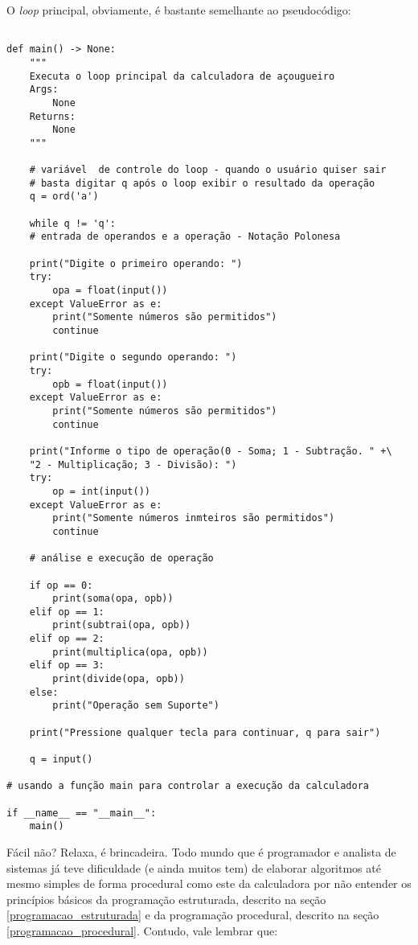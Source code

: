 \documentclass[a4paper, 12pt, onecolumn,singlespacing]{article}
\begin{document}
O \textit{loop} principal, obviamente, é bastante semelhante ao pseudocódigo:
\begin{verbatim}

def main() -> None:
	"""
	Executa o loop principal da calculadora de açougueiro
	Args:
		None
	Returns:
		None
	"""
	
	# variável  de controle do loop - quando o usuário quiser sair
	# basta digitar q após o loop exibir o resultado da operação
	q = ord('a')
	
	while q != 'q':
	# entrada de operandos e a operação - Notação Polonesa
	
	print("Digite o primeiro operando: ")
	try:
		opa = float(input())
	except ValueError as e:
		print("Somente números são permitidos")
		continue
	
	print("Digite o segundo operando: ")
	try:
		opb = float(input())
	except ValueError as e:
		print("Somente números são permitidos")
		continue
	
	print("Informe o tipo de operação(0 - Soma; 1 - Subtração. " +\
	"2 - Multiplicação; 3 - Divisão): ")
	try:
		op = int(input())
	except ValueError as e:
		print("Somente números inmteiros são permitidos")
		continue
	
	# análise e execução de operação
	
	if op == 0:
		print(soma(opa, opb))
	elif op == 1:
		print(subtrai(opa, opb))
	elif op == 2:
		print(multiplica(opa, opb))
	elif op == 3:
		print(divide(opa, opb))
	else:
		print("Operação sem Suporte")
	
	print("Pressione qualquer tecla para continuar, q para sair")
	
	q = input()

# usando a função main para controlar a execução da calculadora

if __name__ == "__main__":
	main()

\end{verbatim}



Fácil não? Relaxa, é brincadeira. Todo mundo que é programador e analista de sistemas já teve dificuldade (e ainda muitos tem) de elaborar algoritmos até mesmo simples de forma procedural como este da calculadora por não entender os princípios básicos da programação estruturada, descrito na seção \ref{programacao_estruturada} e da programação procedural, descrito na seção \ref{programacao_procedural}. Contudo, vale lembrar que:
\end{document}
